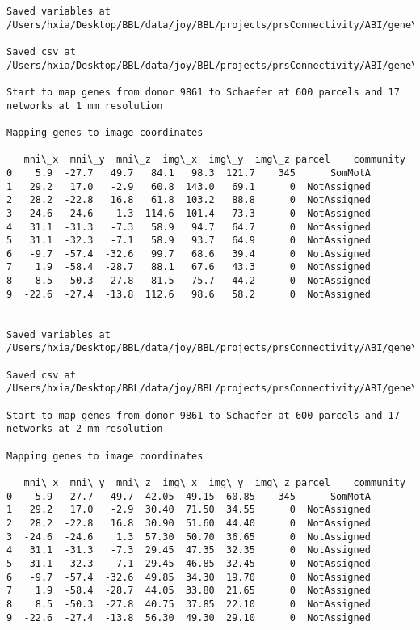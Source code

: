 \documentclass[11pt]{article}
\begin{document}
\begin{Verbatim}[commandchars=\\\{\}]
Saved variables at /Users/hxia/Desktop/BBL/data/joy/BBL/projects/prsConnectivity/ABI/gene\_mapping/9861donor\_600Parcels\_7Network\_2mm.pkl

Saved csv at /Users/hxia/Desktop/BBL/data/joy/BBL/projects/prsConnectivity/ABI/gene\_mapping/9861donor\_600Parcels\_7Network\_2mm.csv

Start to map genes from donor 9861 to Schaefer at 600 parcels and 17 networks at 1 mm resolution

Mapping genes to image coordinates

   mni\_x  mni\_y  mni\_z  img\_x  img\_y  img\_z parcel    community
0    5.9  -27.7   49.7   84.1   98.3  121.7    345      SomMotA
1   29.2   17.0   -2.9   60.8  143.0   69.1      0  NotAssigned
2   28.2  -22.8   16.8   61.8  103.2   88.8      0  NotAssigned
3  -24.6  -24.6    1.3  114.6  101.4   73.3      0  NotAssigned
4   31.1  -31.3   -7.3   58.9   94.7   64.7      0  NotAssigned
5   31.1  -32.3   -7.1   58.9   93.7   64.9      0  NotAssigned
6   -9.7  -57.4  -32.6   99.7   68.6   39.4      0  NotAssigned
7    1.9  -58.4  -28.7   88.1   67.6   43.3      0  NotAssigned
8    8.5  -50.3  -27.8   81.5   75.7   44.2      0  NotAssigned
9  -22.6  -27.4  -13.8  112.6   98.6   58.2      0  NotAssigned


Saved variables at /Users/hxia/Desktop/BBL/data/joy/BBL/projects/prsConnectivity/ABI/gene\_mapping/9861donor\_600Parcels\_17Network\_1mm.pkl

Saved csv at /Users/hxia/Desktop/BBL/data/joy/BBL/projects/prsConnectivity/ABI/gene\_mapping/9861donor\_600Parcels\_17Network\_1mm.csv

Start to map genes from donor 9861 to Schaefer at 600 parcels and 17 networks at 2 mm resolution

Mapping genes to image coordinates

   mni\_x  mni\_y  mni\_z  img\_x  img\_y  img\_z parcel    community
0    5.9  -27.7   49.7  42.05  49.15  60.85    345      SomMotA
1   29.2   17.0   -2.9  30.40  71.50  34.55      0  NotAssigned
2   28.2  -22.8   16.8  30.90  51.60  44.40      0  NotAssigned
3  -24.6  -24.6    1.3  57.30  50.70  36.65      0  NotAssigned
4   31.1  -31.3   -7.3  29.45  47.35  32.35      0  NotAssigned
5   31.1  -32.3   -7.1  29.45  46.85  32.45      0  NotAssigned
6   -9.7  -57.4  -32.6  49.85  34.30  19.70      0  NotAssigned
7    1.9  -58.4  -28.7  44.05  33.80  21.65      0  NotAssigned
8    8.5  -50.3  -27.8  40.75  37.85  22.10      0  NotAssigned
9  -22.6  -27.4  -13.8  56.30  49.30  29.10      0  NotAssigned



\end{Verbatim}
\end{document}
